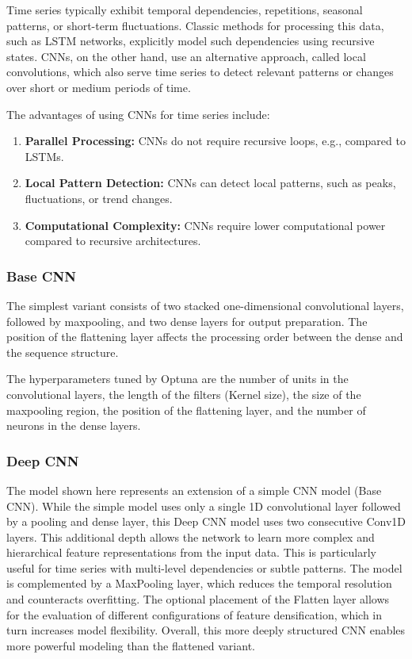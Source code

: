Time series typically exhibit temporal dependencies, repetitions, seasonal patterns, or short-term fluctuations.
Classic methods for processing this data, such as LSTM networks, explicitly model such dependencies using recursive states.
CNNs, on the other hand, use an alternative approach, called local convolutions, which also serve time series to detect relevant patterns or changes over short or medium periods of time.

The advantages of using CNNs for time series include:

\begin{enumerate}
    \item \textbf{Parallel Processing:} CNNs do not require recursive loops, e.g., compared to LSTMs.
    \item \textbf{Local Pattern Detection:} CNNs can detect local patterns, such as peaks, fluctuations, or trend changes.
    \item \textbf{Computational Complexity:} CNNs require lower computational power compared to recursive architectures.
\end{enumerate}

\subsubsection{Base CNN}

The simplest variant consists of two stacked one-dimensional convolutional layers, followed by maxpooling, and two dense layers for output preparation.
The position of the flattening layer affects the processing order between the dense and the sequence structure.

The hyperparameters tuned by Optuna are the number of units in the convolutional layers, the length of the filters (Kernel size), the size of the maxpooling region, the position of the flattening layer, and the number of neurons in the dense layers.



\subsubsection{Deep CNN}

The model shown here represents an extension of a simple CNN model (Base CNN).
While the simple model uses only a single 1D convolutional layer followed by a pooling and dense layer, this Deep CNN model uses two consecutive Conv1D layers.
This additional depth allows the network to learn more complex and hierarchical feature representations from the input data.
This is particularly useful for time series with multi-level dependencies or subtle patterns.
The model is complemented by a MaxPooling layer, which reduces the temporal resolution and counteracts overfitting.
The optional placement of the Flatten layer allows for the evaluation of different configurations of feature densification, which in turn increases model flexibility.
Overall, this more deeply structured CNN enables more powerful modeling than the flattened variant.

